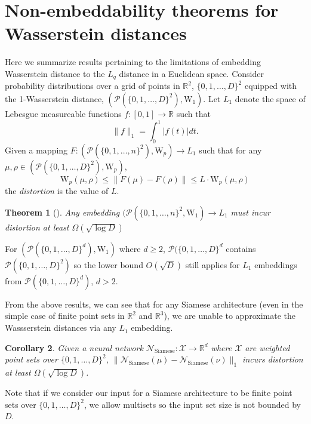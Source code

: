 \documentclass[12pt]{article}
\newcommand{\R}{\mathbb R}
\newtheorem{theorem}{Theorem}[section]
\newtheorem{corollary}[theorem]{Corollary}
\newcommand{\yusu}[1]		{{ \textcolor{darkgreen} {{\sc [Yusu]:} #1}}}
\begin{document}
\section{Non-embeddability theorems for Wasserstein distances}
\label{appendix:euc-embeddings}

Here we summarize results pertaining to the limitations of embedding Wasserstein distance to the $L_q$ distance in a Euclidean space. Consider probability distributions over a grid of points in $\R^2$, $\{0,1, \dots, D\}^2$ equipped with the 1-Wasserstein distance, $(\mathcal{P}(\{0, 1, \dots, D\}^2), \mathrm{W}_1)$. Let $L_1$ denote the space of Lebesgue measureable functions $f: [0, 1] \to \R$ such that 
\begin{equation*}
    \|f\|_1 = \int_0^1 |f(t)|dt.
\end{equation*}
Given a mapping $F: (\mathcal{P}(\{0, 1, \dots, n\}^2), \mathrm{W}_p) \to L_1$ such that for any $\mu, \rho \in (\mathcal{P}(\{0, 1, \dots, D\}^2), \mathrm{W}_p)$, 
\begin{equation}
    \mathrm{W}_p(\mu, \rho) \leq \|F(\mu) - F(\rho)\| \leq L \cdot \mathrm{W}_p(\mu, \rho)
\end{equation}
the \textit{distortion} is the value of $L$. 
\begin{theorem}[\citep{naor2007planar}]
    Any embedding $(\mathcal{P}(\{0,1, \dots, n\}^2, \mathrm{W}_1) \to L_1$ must incur distortion at least $\Omega(\sqrt{\log D})$
\end{theorem}
For $(\mathcal{P}(\{0, 1, \dots, D\}^d), \mathrm{W}_1)$ where $d \geq 2$, $\mathcal{P}(\{0, 1, \dots, D\}^d$ contains $\mathcal{P}(\{0, 1, \dots, D\}^2)$ so the lower bound $O(\sqrt{D})$ still applies for $L_1$ embeddings from $\mathcal{P}(\{0, 1, \dots,D\}^d)$, $d > 2$.

From the above results, we can see that for any Siamese architecture (even in the simple case of finite point sets in $\R^2$ and $\R^3$), we are unable to approximate the Wassserstein distances via any $L_1$ embedding. 

\begin{corollary}
    Given a neural network $\mathcal{N}_{\mathrm{Siamese}}: \mathcal{X} \to \R^d$ where $\mathcal{X}$ are weighted point sets over $\{0, 1, \dots, D\}^2$, $\|\mathcal{N}_{\mathrm{Siamese}}(\mu) - \mathcal{N}_{\mathrm{Siamese}}(\nu)\|_1$ incurs distortion at least $\Omega(\sqrt{\log D})$.
\end{corollary}
Note that if we consider our input for a Siamese architecture to be finite point sets over $\{0,1, \dots, D\}^2$, we allow multisets so the input set size is not bounded by $D$. 
\end{document}
